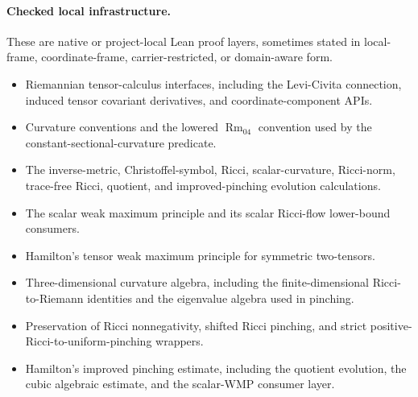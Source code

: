 \documentclass[11pt]{article}
\theoremstyle{plain}
\theoremstyle{definition}
\theoremstyle{remark}
\newcommand{\Rm}{\operatorname{Rm}}
\begin{document}
\paragraph{Checked local infrastructure.}
These are native or project-local Lean proof layers, sometimes stated in
local-frame, coordinate-frame, carrier-restricted, or domain-aware form.
\begin{itemize}[leftmargin=2em]
  \item Riemannian tensor-calculus interfaces, including the Levi-Civita
  connection, induced tensor covariant derivatives, and coordinate-component
  APIs.
  \item Curvature conventions and the lowered \(\Rm_{04}\) convention used by
  the constant-sectional-curvature predicate.
  \item The inverse-metric, Christoffel-symbol, Ricci, scalar-curvature,
  Ricci-norm, trace-free Ricci, quotient, and improved-pinching evolution
  calculations.
  \item The scalar weak maximum principle and its scalar Ricci-flow lower-bound
  consumers.
  \item Hamilton's tensor weak maximum principle for symmetric two-tensors.
  \item Three-dimensional curvature algebra, including the finite-dimensional
  Ricci-to-Riemann identities and the eigenvalue algebra used in pinching.
  \item Preservation of Ricci nonnegativity, shifted Ricci pinching, and strict
  positive-Ricci-to-uniform-pinching wrappers.
  \item Hamilton's improved pinching estimate, including the quotient
  evolution, the cubic algebraic estimate, and the scalar-WMP consumer layer.
\end{itemize}
\end{document}
